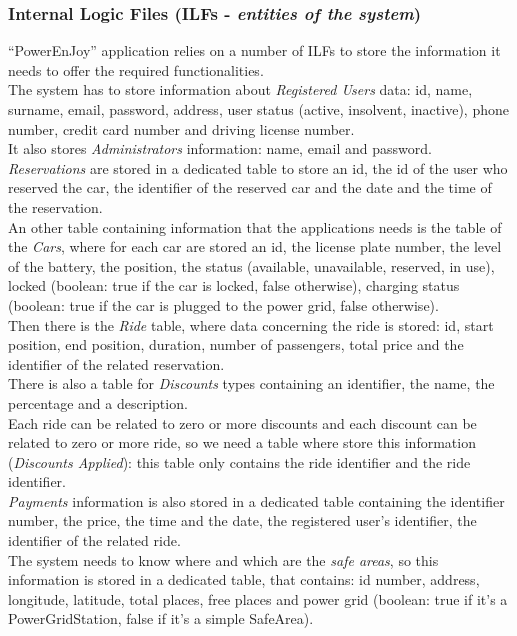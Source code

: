 \subsubsection{Internal Logic Files (ILFs - \textit{entities of the system})}
``PowerEnJoy'' application relies on a number of ILFs to store the information it needs to offer the required functionalities. \\
The system has to store information about \textit{Registered Users} data: id, name, surname, email, password, address, user status (active, insolvent, inactive), phone number, credit card number and driving license number. \\
It also stores \textit{Administrators} information: name, email and password. \\
\textit{Reservations} are stored in a dedicated table to store an id, the id of the user who reserved the car, the identifier of the reserved car and the date and the time of the reservation. \\
An other table containing information that the applications needs is the table of the \textit{Cars}, where for each car are stored an id, the license plate number, the level of the battery, the position, the status (available, unavailable, reserved, in use), locked (boolean: true if the car is locked, false otherwise), charging status (boolean: true if the car is plugged to the power grid, false otherwise). \\
Then there is the \textit{Ride} table, where data concerning the ride is stored: id, start position, end position, duration, number of passengers, total price and the identifier of the related reservation. \\ 
There is also a table for \textit{Discounts} types containing an identifier, the name, the percentage and a description. \\ 
Each ride can be related to zero or more discounts and each discount can be related to zero or more ride, so we need a table where store this information (\textit{Discounts Applied}): this table only contains the ride identifier and the ride identifier. \\
\textit{Payments} information is also stored in a dedicated table containing the identifier number, the price, the time and the date, the registered user's identifier, the identifier of the related ride. \\
The system needs to know where and which are the \textit{safe areas}, so this information is stored in a dedicated table, that contains: id number, address, longitude, latitude, total places, free places and power grid (boolean: true if it's a PowerGridStation, false if it's a simple SafeArea).

